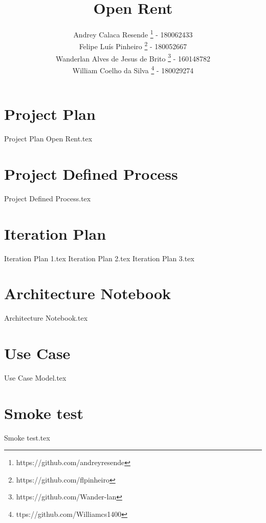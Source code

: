 \documentclass[a4paper,11pt]{book}
\title{Open Rent}
\author{
    Andrey Calaca Resende \footnote{https://github.com/andreyresende} - 180062433\\
    Felipe Luís Pinheiro \footnote{https://github.com/flpinheiro} - 180052667 \\
    Wanderlan Alves de Jesus de Brito \footnote{https://github.com/Wander-lan} - 160148782\\
    William Coelho da Silva \footnote{ttps://github.com/Williamcs1400} - 180029274

}
\date{}
\begin{document}
\maketitle

\tableofcontents

\chapter{Project Plan}
{Project Plan Open Rent.tex}

\chapter{Project Defined Process}
{Project Defined Process.tex}

\chapter{Iteration Plan}
{Iteration Plan 1.tex}
{Iteration Plan 2.tex}
{Iteration Plan 3.tex}

\chapter{Architecture Notebook}
{Architecture Notebook.tex}

\chapter{Use Case}
{Use Case Model.tex}

\chapter{Smoke test}
{Smoke test.tex}

\printglossary
\end{document}
